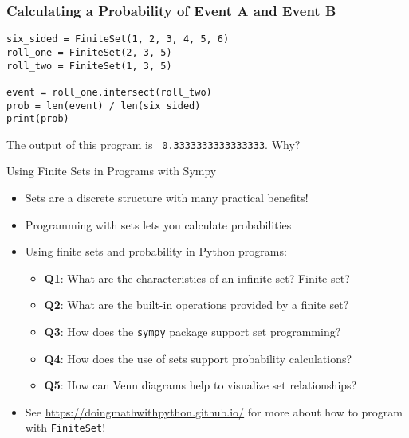 \documentclass[14pt,aspectratio=169]{beamer}
\begin{document}
%
\begin{frame}[fragile]
  \frametitle{Calculating a Probability of Event A and Event B}
  \normalsize
  \begin{minipage}{6in}
    \vspace*{.25in}
    \begin{verbatim}
six_sided = FiniteSet(1, 2, 3, 4, 5, 6)
roll_one = FiniteSet(2, 3, 5)
roll_two = FiniteSet(1, 3, 5)

event = roll_one.intersect(roll_two)
prob = len(event) / len(six_sided)
print(prob)
    \end{verbatim}
  \end{minipage}
  \vspace*{.05in}
  \begin{center}
    \normalsize \noindent The output of this program is {\tt
    0.3333333333333333}. Why? \\
  \end{center}
\end{frame}

%
\begin{frame}{Using Finite Sets in Programs with Sympy}
  \begin{itemize}
    \item Sets are a discrete structure with many practical benefits!
      \vspace*{-.2in}
    \item Programming with sets lets you calculate probabilities
      \vspace*{-.2in}
    \item Using finite sets and probability in Python programs:
      \begin{itemize}
        \item {\bf Q1}: What are the characteristics of an infinite set? Finite set?
        \item {\bf Q2}: What are the built-in operations provided by a finite set?
        \item {\bf Q3}: How does the {\tt sympy} package support set
          programming?
        \item {\bf Q4}: How does the use of sets support probability
          calculations?
        \item {\bf Q5}: How can Venn diagrams help to visualize set
          relationships?
      \end{itemize}
      \vspace*{-.2in}
    \item See \url{https://doingmathwithpython.github.io/} for more about how to
      program with {\tt FiniteSet}!
  \end{itemize}
\end{frame}
\end{document}
